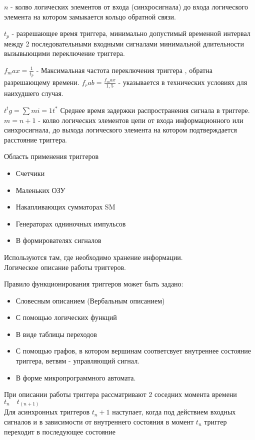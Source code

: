 $n$ - колво логических элементов от входа  (синхросигнала) до входа логического элемента на котором замыкается кольцо обратной связи.

$t_p$ - разрешающее время триггера, минимально допустимый временной интервал между 2 последовательными входными сигналами
 минимальной длительности вызывыющими переключение триггера.

$f_max = \frac{1}{t_p}$ - Максимальная частота переключения триггера , обратна разрешающему времени.
$f_rab = \frac{f_max}{1,5}$  - указывается в технических условиях для наихудшего случая.

$t^tg = \sum{m}{i = 1} t^* $  Среднее время задержки распространения сигнала в триггере.
$m = n + 1$ - колво логических элементов цепи от входа информационного или синхросигнала, до выхода логического элемента на котором подтверждается расстояние триггера.



Область применения триггеров
\begin{itemize}
  \item Счетчики
  \item Маленьких ОЗУ
  \item Накапливающих сумматорах SM
  \item Генераторах одниночных импульсов
  \item В формирователях сигналов
\end{itemize}
Используются там, где необходимо хранение информации.\\

\Large {Логическое описание работы триггеров.}

Правило функционирования триггеров может быть задано:
\begin{itemize}
  \item Словесным описанием (Вербальным описанием)
  \item С помощью логических функций
  \item В виде таблицы переходов
  \item С помощью графов, в котором вершинам соответсвует внутреннее состояние триггера, ветвям - управляющий сигнал.
  \item В форме микропрограммного автомата.
\end{itemize}

При описании работы триггера рассматривают 2 соседних момента времени $t_n \quad t_(n+1)$\\
Для асинхронных триггеров $t_n+1$ наступает, когда под действием входных сигналов
и в зависимости от внутреннего состояния в момент $t_n$ триггер переходит в последующее состояние\\

